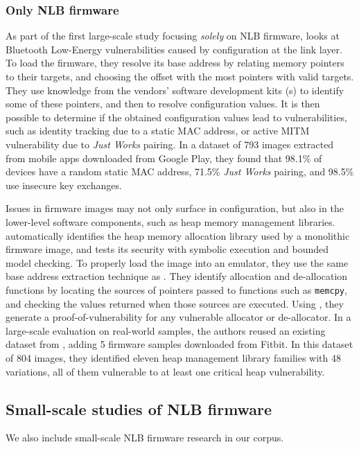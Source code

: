 \subsubsection{Only NLB firmware}
As part of the first large-scale study focusing \textit{solely} on NLB firmware,  looks at Bluetooth Low-Energy vulnerabilities caused by configuration at the link layer.
To load the firmware, they resolve its base address by relating memory pointers to their targets, and choosing the offset with the most pointers with valid targets.
They use knowledge from the vendors' software development kits (s) to identify some of these pointers, and then to resolve configuration values.
It is then possible to determine if the obtained configuration values lead to vulnerabilities, such as identity tracking due to a static MAC address, or active MITM vulnerability due to \textit{Just Works} pairing.
In a dataset of \num{793} images extracted from mobile apps downloaded from Google Play, they found that 98.1\% of devices have a random static MAC address, 71.5\% \textit{Just Works} pairing, and 98.5\% use insecure key exchanges.

Issues in firmware images may not only surface in configuration, but also in the lower-level software components, such as heap memory management libraries.
 automatically identifies the heap memory allocation library used by a monolithic firmware image, and tests its security with symbolic execution and bounded model checking.
To properly load the image into an emulator, they use the same base address extraction technique as .
They identify allocation and de-allocation functions by locating the sources of pointers passed to functions such as \texttt{memcpy}, and checking the values returned when those sources are executed.
Using , they generate a proof-of-vulnerability for any vulnerable allocator or de-allocator.
In a large-scale evaluation on real-world samples, the authors reused an existing dataset from , adding 5 firmware samples downloaded from Fitbit.
In this dataset of \num{804} images, they identified eleven heap management library families with \num{48} variations, all of them vulnerable to at least one critical heap vulnerability.


\subsection{Small-scale studies of NLB firmware}
We also include small-scale NLB firmware research in our corpus.

